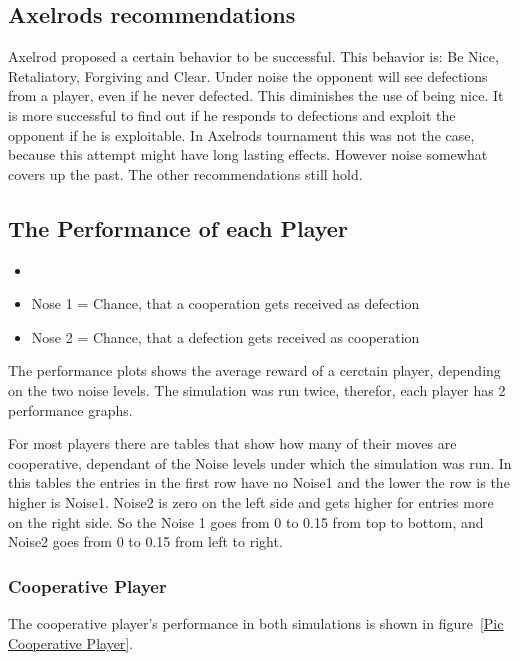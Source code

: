 \subsection{Axelrods recommendations}
Axelrod proposed a certain behavior to be successful. This behavior is: Be Nice, Retaliatory, Forgiving and  Clear.  Under noise the opponent will see defections from a player, even if he never defected. This diminishes the use of being nice. It is more successful to find out if he responds to defections and exploit the opponent if he is exploitable. In Axelrods tournament this was not the case, because this attempt might have long lasting effects. However noise somewhat covers up the past. The other recommendations still hold.

\subsection{The Performance of each Player}
\begin{definition}[Noise]
\begin{itemize}
	\item[] \hspace{3mm}
	\item Nose 1 = Chance, that a cooperation gets received as defection
	\item Nose 2 = Chance, that a defection gets received as cooperation
\end{itemize}
\end{definition}
The performance plots shows the average reward of a cerctain player, depending on the two noise levels. The simulation was run twice, therefor, each player has 2 performance graphs.

For most players there are tables that show how many of their moves are cooperative, dependant of the Noise levels under which the simulation was run. In this tables the entries in the first row have no Noise1 and the lower the row is the higher is Noise1. Noise2 is zero on the left side and gets higher for entries more on the right side. So the Noise 1 goes from 0 to 0.15 from top to bottom, and Noise2 goes from 0 to 0.15 from left to right.

\subsubsection{Cooperative Player}

The cooperative player's performance in both simulations is shown in figure~\ref{Pic Cooperative Player}.\\

